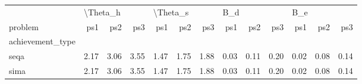 \begin{tabular}{lrrrrrrrrrrrr}
\toprule
{} & \multicolumn{3}{l}{\textbackslash Theta\_h} & \multicolumn{3}{l}{\textbackslash Theta\_s} & \multicolumn{3}{l}{B\_d} & \multicolumn{3}{l}{B\_e} \\
problem &      ps1 &  ps2 &  ps3 &      ps1 &  ps2 &  ps3 &  ps1 &  ps2 &  ps3 &  ps1 &  ps2 &  ps3 \\
achievement\_type &          &      &      &          &      &      &      &      &      &      &      &      \\
\midrule
seqa             &     2.17 & 3.06 & 3.55 &     1.47 & 1.75 & 1.88 & 0.03 & 0.11 & 0.20 & 0.02 & 0.08 & 0.14 \\
sima             &     2.17 & 3.06 & 3.55 &     1.47 & 1.75 & 1.88 & 0.03 & 0.11 & 0.20 & 0.02 & 0.08 & 0.14 \\
\bottomrule
\end{tabular}
